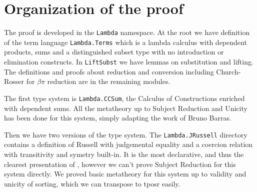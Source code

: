 \documentclass[11pt]{article}
\def\TPOSR{{\sc tposr}\xspace}
\def\tactic#1{\texttt{#1}}
\def\coqmodule#1{\texttt{#1}}
\begin{document}

\section*{Organization of the \Coq proof}
The proof is developed in the \coqmodule{Lambda} namespace. At the root
we have definition of the term language \coqmodule{Lambda.Terms} which
is a lambda calculus with dependent products, sums and a distinguished
subset type with no introduction or elimination constructs. 
In \coqmodule{LiftSubst} we have lemmas on substitution and lifting.
The definitions and proofs about
reduction and conversion including Church-Rosser for $\beta\pi$ reduction
are in the remaining modules.

The first type system is \coqmodule{Lambda.CCSum}, the Calculus of
Constructions enriched with dependent sums. All the metatheory up to
Subject Reduction and Unicity has been done for this system, simply
adapting the work of Bruno Barras.

Then we have two versions of the \Russell type system.
The \coqmodule{Lambda.JRussell} directory contains a definition of
Russell with judgemental equality and a coercion relation with
transitivity and symetry built-in. It is the most declarative, and thus
the clearest presentation of \Russell, however we can't prove Subject
Reduction for this system directly. We proved basic metatheory for this
system up to validity and unicity of sorting, which we can transpose to
\TPOSR easily.
\end{document}
